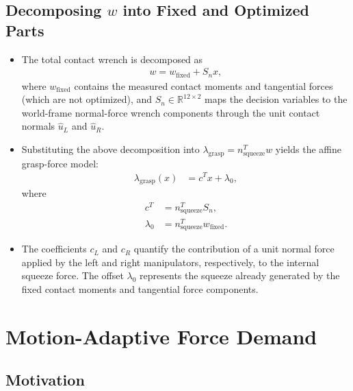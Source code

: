 \documentclass[conference]{IEEEtran}
\begin{document}
\subsection{Decomposing $w$ into Fixed and Optimized Parts}
\begin{itemize}
    \item The total contact wrench is decomposed as
    \begin{align}
        w = w_{\mathrm{fixed}} + S_n x,
    \end{align}
    where \(w_{\mathrm{fixed}}\) contains the measured contact moments and
    tangential forces (which are not optimized), and
    \(S_n \in \mathbb{R}^{12 \times 2}\) maps the decision variables to the
    world-frame normal-force wrench components through the unit contact normals
    \(\hat{u}_L\) and \(\hat{u}_R\).

    \item Substituting the above decomposition into
    \(\lambda_{\mathrm{grasp}} = n_{\mathrm{squeeze}}^{T} w\) yields the affine
    grasp-force model:
    \begin{align}
        \lambda_{\mathrm{grasp}}(x)
        &= c^{T} x + \lambda_{0},
    \end{align}
    where
    \begin{align}
        c^{T} &= n_{\mathrm{squeeze}}^{T} S_n, \\
        \lambda_{0} &= n_{\mathrm{squeeze}}^{T} w_{\mathrm{fixed}}.
    \end{align}

    \item The coefficients \(c_L\) and \(c_R\) quantify the contribution of a
    unit normal force applied by the left and right manipulators,
    respectively, to the internal squeeze force. The offset
    \(\lambda_{0}\) represents the squeeze already generated by the fixed
    contact moments and tangential force components.
\end{itemize}


\section{Motion-Adaptive Force Demand}

\subsection{Motivation}
\end{document}
